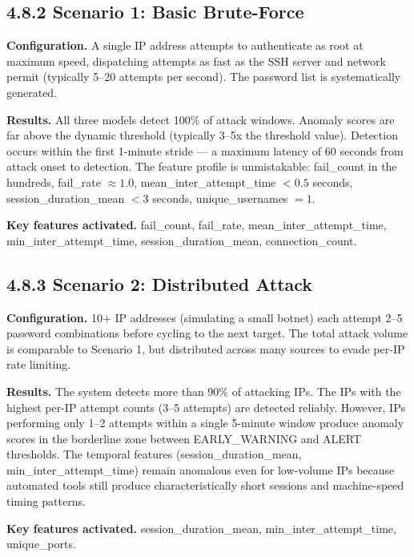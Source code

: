 \documentclass[
  a4paper]{report}
\begin{document}
\subsection{4.8.2 Scenario 1: Basic
Brute-Force}\label{scenario-1-basic-brute-force}

\textbf{Configuration.} A single IP address attempts to authenticate as
root at maximum speed, dispatching attempts as fast as the SSH server
and network permit (typically 5--20 attempts per second). The password
list is systematically generated.

\textbf{Results.} All three models detect 100\% of attack windows.
Anomaly scores are far above the dynamic threshold (typically 3--5x the
threshold value). Detection occurs within the first 1-minute stride ---
a maximum latency of 60 seconds from attack onset to detection. The
feature profile is unmistakable: fail\_count in the hundreds, fail\_rate
\(\approx 1.0\), mean\_inter\_attempt\_time \(< 0.5\) seconds,
session\_duration\_mean \(< 3\) seconds, unique\_usernames \(= 1\).

\textbf{Key features activated.} fail\_count, fail\_rate,
mean\_inter\_attempt\_time, min\_inter\_attempt\_time,
session\_duration\_mean, connection\_count.

\subsection{4.8.3 Scenario 2: Distributed
Attack}\label{scenario-2-distributed-attack}

\textbf{Configuration.} 10+ IP addresses (simulating a small botnet)
each attempt 2--5 password combinations before cycling to the next
target. The total attack volume is comparable to Scenario 1, but
distributed across many sources to evade per-IP rate limiting.

\textbf{Results.} The system detects more than 90\% of attacking IPs.
The IPs with the highest per-IP attempt counts (3--5 attempts) are
detected reliably. However, IPs performing only 1--2 attempts within a
single 5-minute window produce anomaly scores in the borderline zone
between EARLY\_WARNING and ALERT thresholds. The temporal features
(session\_duration\_mean, min\_inter\_attempt\_time) remain anomalous
even for low-volume IPs because automated tools still produce
characteristically short sessions and machine-speed timing patterns.

\textbf{Key features activated.} session\_duration\_mean,
min\_inter\_attempt\_time, unique\_ports.
\end{document}
